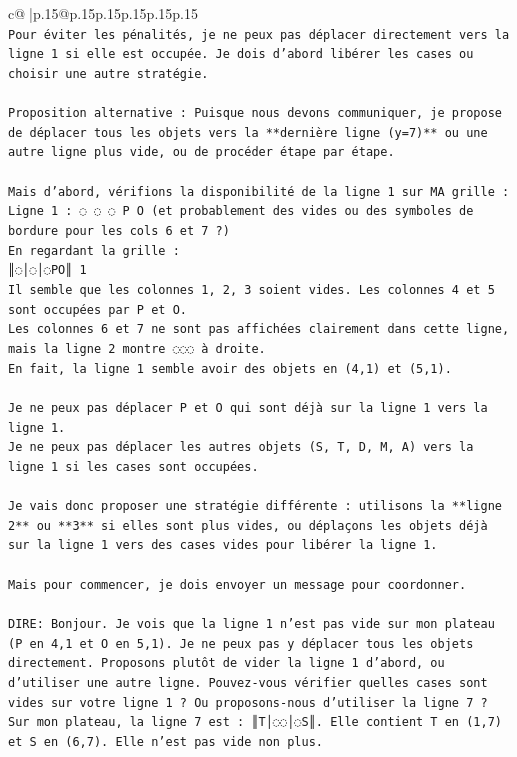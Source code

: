 \documentclass{article}
\begin{document}
{\begin{supertabular}{c@{$\;$}|p{.15\linewidth}@{}p{.15\linewidth}p{.15\linewidth}p{.15\linewidth}p{.15\linewidth}p{.15\linewidth}}
{{{\\ 
\texttt{Pour éviter les pénalités, je ne peux pas déplacer directement vers la ligne 1 si elle est occupée. Je dois d'abord libérer les cases ou choisir une autre stratégie.} \\
\\ 
\texttt{Proposition alternative : Puisque nous devons communiquer, je propose de déplacer tous les objets vers la **dernière ligne (y=7)** ou une autre ligne plus vide, ou de procéder étape par étape.} \\
\\ 
\texttt{Mais d'abord, vérifions la disponibilité de la ligne 1 sur MA grille :} \\
\texttt{Ligne 1 : ◌ ◌ ◌ P O (et probablement des vides ou des symboles de bordure pour les cols 6 et 7 ?)} \\
\texttt{En regardant la grille :} \\
\texttt{║◌│◌│◌PO║ 1} \\
\texttt{Il semble que les colonnes 1, 2, 3 soient vides. Les colonnes 4 et 5 sont occupées par P et O.} \\
\texttt{Les colonnes 6 et 7 ne sont pas affichées clairement dans cette ligne, mais la ligne 2 montre ◌◌◌ à droite.} \\
\texttt{En fait, la ligne 1 semble avoir des objets en (4,1) et (5,1).} \\
\\ 
\texttt{Je ne peux pas déplacer P et O qui sont déjà sur la ligne 1 vers la ligne 1.} \\
\texttt{Je ne peux pas déplacer les autres objets (S, T, D, M, A) vers la ligne 1 si les cases sont occupées.} \\
\\ 
\texttt{Je vais donc proposer une stratégie différente : utilisons la **ligne 2** ou **3** si elles sont plus vides, ou déplaçons les objets déjà sur la ligne 1 vers des cases vides pour libérer la ligne 1.} \\
\\ 
\texttt{Mais pour commencer, je dois envoyer un message pour coordonner.} \\
\\ 
\texttt{DIRE: Bonjour. Je vois que la ligne 1 n'est pas vide sur mon plateau (P en 4,1 et O en 5,1). Je ne peux pas y déplacer tous les objets directement. Proposons plutôt de vider la ligne 1 d'abord, ou d'utiliser une autre ligne. Pouvez{-}vous vérifier quelles cases sont vides sur votre ligne 1 ? Ou proposons{-}nous d'utiliser la ligne 7 ? Sur mon plateau, la ligne 7 est : ║T│◌◌│◌S║. Elle contient T en (1,7) et S en (6,7). Elle n'est pas vide non plus.} \\
}}}
\end{supertabular}}
\end{document}

